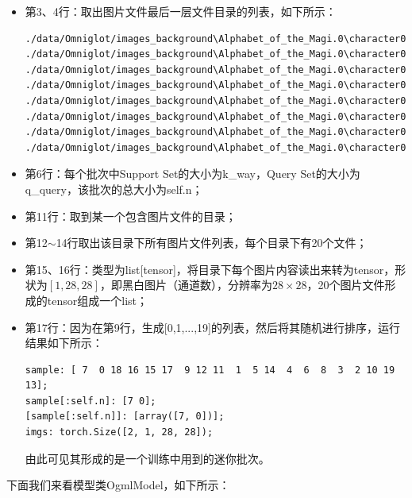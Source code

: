 \begin{itemize}
\item 第3、4行：取出图片文件最后一层文件目录的列表，如下所示：
\begin{lstlisting}
./data/Omniglot/images_background\Alphabet_of_the_Magi.0\character01
./data/Omniglot/images_background\Alphabet_of_the_Magi.0\character02
./data/Omniglot/images_background\Alphabet_of_the_Magi.0\character03
./data/Omniglot/images_background\Alphabet_of_the_Magi.0\character04
./data/Omniglot/images_background\Alphabet_of_the_Magi.0\character05
./data/Omniglot/images_background\Alphabet_of_the_Magi.0\character06
./data/Omniglot/images_background\Alphabet_of_the_Magi.0\character07
./data/Omniglot/images_background\Alphabet_of_the_Magi.0\character08
\end{lstlisting}
\item 第6行：每个批次中Support Set的大小为k\_way，Query Set的大小为q\_query，该批次的总大小为self.n；
\item 第11行：取到某一个包含图片文件的目录；
\item 第12$\sim$14行取出该目录下所有图片文件列表，每个目录下有20个文件；
\item 第15、16行：类型为list[tensor]，将目录下每个图片内容读出来转为tensor，形状为$[1, 28, 28]$，即黑白图片（通道数），分辨率为$28 \times 28$，20个图片文件形成的tensor组成一个list；
\item 第17行：因为在第9行，生成[0,1,...,19]的列表，然后将其随机进行排序，运行结果如下所示：
\begin{lstlisting}
sample: [ 7  0 18 16 15 17  9 12 11  1  5 14  4  6  8  3  2 10 19 13];
sample[:self.n]: [7 0];
[sample[:self.n]]: [array([7, 0])];
imgs: torch.Size([2, 1, 28, 28]);
\end{lstlisting}
由此可见其形成的是一个训练中用到的迷你批次。
\end{itemize}
下面我们来看模型类OgmlModel，如下所示：
